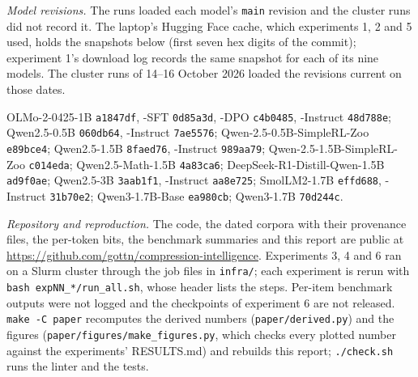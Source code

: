 \documentclass[11pt,a4paper]{article}
\theoremstyle{definition}
\begin{document}
\emph{Model revisions.} The runs loaded each model's \texttt{main} revision and the cluster runs did not record
it. The laptop's Hugging Face cache, which experiments 1, 2 and 5 used, holds the snapshots below (first seven hex
digits of the commit); experiment 1's download log records the same snapshot for each of its nine models. The
cluster runs of 14--16 October 2026 loaded the revisions current on those dates.

{\footnotesize\sloppy\noindent
OLMo-2-0425-1B \texttt{a1847df}, -SFT \texttt{0d85a3d}, -DPO \texttt{c4b0485}, -Instruct \texttt{48d788e};
Qwen2.5-0.5B \texttt{060db64}, -Instruct \texttt{7ae5576}; Qwen-2.5-0.5B-SimpleRL-Zoo \texttt{e89bce4};
Qwen2.5-1.5B \texttt{8faed76}, -Instruct \texttt{989aa79}; Qwen-2.5-1.5B-SimpleRL-Zoo \texttt{c014eda};
Qwen2.5-Math-1.5B \texttt{4a83ca6}; DeepSeek-R1-Distill-Qwen-1.5B \texttt{ad9f0ae}; Qwen2.5-3B \texttt{3aab1f1},
-Instruct \texttt{aa8e725}; SmolLM2-1.7B \texttt{effd688}, -Instruct \texttt{31b70e2}; Qwen3-1.7B-Base
\texttt{ea980cb}; Qwen3-1.7B \texttt{70d244c}.\par}

\emph{Repository and reproduction.} The code, the dated corpora with their provenance files, the per-token bits,
the benchmark summaries and this report are public at \url{https://github.com/gottn/compression-intelligence}.
Experiments 3, 4 and 6 ran on a Slurm cluster through the job files in \texttt{infra/}; each experiment is rerun
with \texttt{bash expNN\_*/run\_all.sh}, whose header lists the steps. Per-item benchmark outputs were not logged
and the checkpoints of experiment 6 are not released. \texttt{make -C paper} recomputes the derived numbers
(\texttt{paper/derived.py}) and the figures (\texttt{paper/figures/make\_figures.py}, which checks every plotted
number against the experiments' RESULTS.md) and rebuilds this report; \texttt{./check.sh} runs the linter and the
tests.
\end{document}
